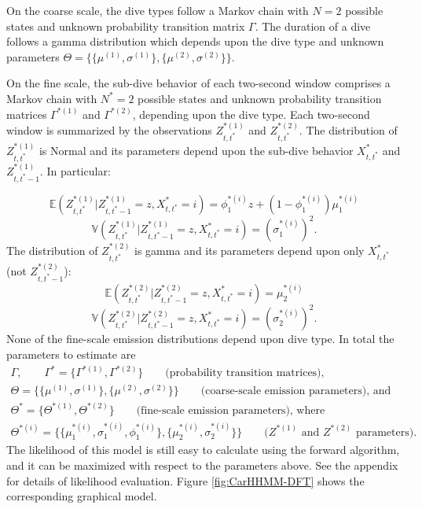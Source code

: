 On the coarse scale, the dive types follow a Markov chain with $N=2$ possible states and unknown probability transition matrix $\Gamma$. The duration of a dive follows a gamma distribution which depends upon the dive type and unknown parameters $\Theta = \{\{\mu^{(1)},\sigma^{(1)}\},\{\mu^{(2)},\sigma^{(2)}\}\}$.

On the fine scale, the sub-dive behavior of each two-second window comprises a Markov chain with $N^*=2$ possible states and unknown probability transition matrices $\Gamma^{*(1)}$ and $\Gamma^{*(2)}$, depending upon the dive type. Each two-second window is summarized by the observations $Z^{*(1)}_{t,t^*}$ and $Z^{*(2)}_{t,t^*}$. The distribution of $Z^{*(1)}_{t,t^*}$ is Normal and its parameters depend upon the sub-dive behavior $X^*_{t,t^*}$ and $Z^{*(1)}_{t,t^*-1}$. In particular:

$$\mathbb{E}(Z^{*(1)}_{t,t^*}|Z^{*(1)}_{t,t^*-1} = z,X^*_{t,t^*} = i) = \phi_1^{*(i)}z + (1-\phi_1^{*(i)}) \mu_1^{*(i)}$$
$$\mathbb{V}(Z^{*(1)}_{t,t^*}|Z^{*(1)}_{t,t^*-1} = z,X^*_{t,t^*} = i) = \left(\sigma_1^{*(i)}\right)^2.$$
%
The distribution of $Z^{*(2)}_{t,t^*}$ is gamma and its parameters depend upon only $X^*_{t,t^*}$ (not $Z^{*(2)}_{t,t^*-1}$):
%
$$\mathbb{E}(Z^{*(2)}_{t,t^*}|Z^{*(2)}_{t,t^*-1} = z,X^*_{t,t^*} = i) = \mu_2^{*(i)}$$
$$\mathbb{V}(Z^{*(2)}_{t,t^*}|Z^{*(2)}_{t,t^*-1} = z,X^*_{t,t^*} = i) = \left(\sigma_2^{*(i)}\right)^2.$$
%
None of the fine-scale emission distributions depend upon dive type. In total the parameters to estimate are
%
\begin{gather*}
    \Gamma, \qquad \Gamma^{*} = \{\Gamma^{*(1)},\Gamma^{*(2)}\} \qquad \text{(probability transition matrices)}, \\
    \Theta = \{\{\mu^{(1)},\sigma^{(1)}\},\{\mu^{(2)},\sigma^{(2)}\}\} \qquad \text{(coarse-scale emission parameters), and} \\
    \Theta^* = \{\Theta^{*(1)},\Theta^{*(2)}\}  \qquad \text{(fine-scale emission parameters), where} \\
    \Theta^{*(i)} =  \{\{\mu_1^{*(i)},\sigma_1^{*(i)},\phi_1^{*(i)}\},\{\mu_2^{*(i)},\sigma_2^{*(i)}\}\} \qquad \text{(}Z^{*(1)} \text{ and } Z^{*(2)} \text{ parameters).}
\end{gather*}
%
The likelihood of this model is still easy to calculate using the forward algorithm, and it can be maximized with respect to the parameters above. See the appendix for details of likelihood evaluation. Figure \ref{fig:CarHHMM-DFT} shows the corresponding graphical model.

